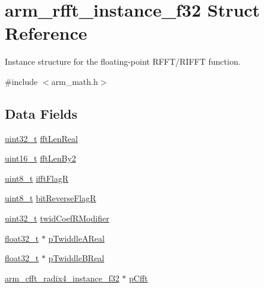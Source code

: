 \hypertarget{structarm__rfft__instance__f32}{\section{arm\-\_\-rfft\-\_\-instance\-\_\-f32 Struct Reference}
\label{structarm__rfft__instance__f32}
}


Instance structure for the floating-\/point R\-F\-F\-T/\-R\-I\-F\-F\-T function.  




{\ttfamily \#include $<$arm\-\_\-math.\-h$>$}

\subsection*{Data Fields}
\begin{DoxyCompactItemize}
\item 
\hyperlink{stdint_8h_a435d1572bf3f880d55459d9805097f62}{uint32\-\_\-t} \hyperlink{structarm__rfft__instance__f32_a4219d4669699e4efdcb150ed7a0d9a57}{fft\-Len\-Real}
\item 
\hyperlink{stdint_8h_a273cf69d639a59973b6019625df33e30}{uint16\-\_\-t} \hyperlink{structarm__rfft__instance__f32_a075076e07ebb8521d8e3b49a31db6c57}{fft\-Len\-By2}
\item 
\hyperlink{stdint_8h_aba7bc1797add20fe3efdf37ced1182c5}{uint8\-\_\-t} \hyperlink{structarm__rfft__instance__f32_a5ee6d10a934ab4b666e0bb286c3d633f}{ifft\-Flag\-R}
\item 
\hyperlink{stdint_8h_aba7bc1797add20fe3efdf37ced1182c5}{uint8\-\_\-t} \hyperlink{structarm__rfft__instance__f32_ac342f3248157cbbd2f04a3c8ec9fc9eb}{bit\-Reverse\-Flag\-R}
\item 
\hyperlink{stdint_8h_a435d1572bf3f880d55459d9805097f62}{uint32\-\_\-t} \hyperlink{structarm__rfft__instance__f32_aede85350fb5ae6baa1b3e8bfa15b18d6}{twid\-Coef\-R\-Modifier}
\item 
\hyperlink{arm__math_8h_a4611b605e45ab401f02cab15c5e38715}{float32\-\_\-t} $\ast$ \hyperlink{structarm__rfft__instance__f32_a534cc7e6e9b3e3dd022fad611c762142}{p\-Twiddle\-A\-Real}
\item 
\hyperlink{arm__math_8h_a4611b605e45ab401f02cab15c5e38715}{float32\-\_\-t} $\ast$ \hyperlink{structarm__rfft__instance__f32_a23543ecfd027fea2477fe1eea23c3c4d}{p\-Twiddle\-B\-Real}
\item 
\hyperlink{structarm__cfft__radix4__instance__f32}{arm\-\_\-cfft\-\_\-radix4\-\_\-instance\-\_\-f32} $\ast$ \hyperlink{structarm__rfft__instance__f32_a9f47ba9f50c81e4445ae3827b981bc05}{p\-Cfft}
\end{DoxyCompactItemize}



